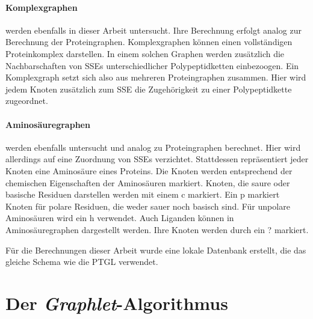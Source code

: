 \documentclass{report}
\begin{document}
\paragraph{Komplexgraphen}

werden ebenfalls in dieser Arbeit untersucht. Ihre Berechnung erfolgt analog zur Berechnung der Proteingraphen. Komplexgraphen k\"onnen einen vollst\"andigen Proteinkomplex darstellen. In einem solchen Graphen werden zus\"atzlich die Nachbarschaften von SSEs unterschiedlicher Polypeptidketten einbezoogen. Ein Komplexgraph setzt sich also aus mehreren Proteingraphen zusammen. Hier wird jedem Knoten zus\"atzlich zum SSE die Zugeh\"origkeit zu einer Polypeptidkette zugeordnet.

\paragraph{Aminos\"auregraphen} werden ebenfalls untersucht und analog zu Proteingraphen berechnet. Hier wird allerdings auf eine Zuordnung von SSEs verzichtet. Stattdessen repr\"asentiert jeder Knoten eine Aminos\"aure eines Proteins. Die Knoten werden entsprechend der chemischen Eigenschaften der Aminos\"auren markiert. Knoten, die saure oder basische Residuen darstellen werden mit einem c markiert. Ein p markiert Knoten f\"ur polare Residuen, die weder sauer noch basisch sind. F\"ur unpolare Aminos\"auren wird ein h verwendet. Auch Liganden k\"onnen in Aminos\"auregraphen dargestellt werden. Ihre Knoten werden durch ein ? markiert.


F\"ur die Berechnungen dieser Arbeit wurde eine lokale Datenbank erstellt, die das gleiche Schema wie die PTGL verwendet.

\section{Der \textit{Graphlet}-Algorithmus}
\end{document}

